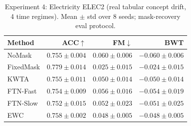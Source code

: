 \begin{table}[h]
\centering
\caption{Experiment 4: Electricity ELEC2 (real tabular concept drift, 4 time regimes).  Mean $\pm$ std over 8 seeds; mask-recovery eval protocol.}
\label{tab:exp4}
\begin{tabular}{l rrr}
\toprule
Method & ACC$\uparrow$ & FM$\downarrow$ & BWT \\
\midrule
NoMask & $0.755\pm0.004$ & $0.060\pm0.006$ & $-0.060\pm0.006$ \\
FixedMask & $0.779\pm0.014$ & $0.025\pm0.015$ & $-0.024\pm0.015$ \\
KWTA & $0.755\pm0.011$ & $0.050\pm0.014$ & $-0.050\pm0.014$ \\
FTN-Fast & $0.754\pm0.009$ & $0.056\pm0.016$ & $-0.054\pm0.019$ \\
FTN-Slow & $0.752\pm0.015$ & $0.052\pm0.023$ & $-0.051\pm0.025$ \\
EWC & $0.758\pm0.002$ & $0.048\pm0.005$ & $-0.048\pm0.005$ \\
\bottomrule
\end{tabular}
\end{table}
